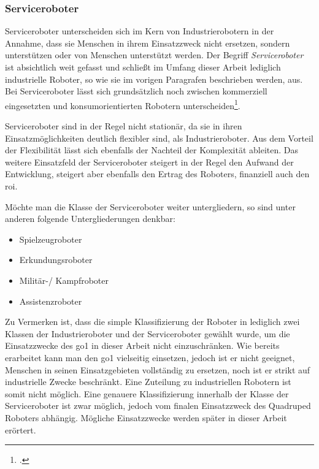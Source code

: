 \subsubsection{Serviceroboter}

Serviceroboter unterscheiden sich im Kern von Industrierobotern in der Annahme, dass sie Menschen in ihrem Einsatzzweck nicht ersetzen,
sondern unterstützen oder von Menschen unterstützt werden.
Der Begriff \emph{Serviceroboter} ist absichtlich weit gefasst und schließt im Umfang dieser Arbeit lediglich industrielle
Roboter, so wie sie im vorigen Paragrafen beschrieben werden, aus.
Bei Serviceroboter lässt sich grundsätzlich noch zwischen kommerziell eingesetzten und konsumorientierten Robotern unterscheiden\footcite{statista_robotics_market}.

Serviceroboter sind in der Regel nicht stationär, da sie in ihren Einsatzmöglichkeiten deutlich flexibler sind, als Industrieroboter.
Aus dem Vorteil der Flexibilität lässt sich ebenfalls der Nachteil der Komplexität ableiten.
Das weitere Einsatzfeld der Serviceroboter steigert in der Regel den Aufwand der Entwicklung, steigert aber ebenfalls
den Ertrag des Roboters, finanziell auch den \gls{roi}.

Möchte man die Klasse der Serviceroboter weiter untergliedern, so sind unter anderen folgende Untergliederungen denkbar:

\begin{itemize}
    \item Spielzeugroboter
    \item Erkundungsroboter
    \item Militär-/ Kampfroboter
    \item Assistenzroboter
\end{itemize}

Zu Vermerken ist, dass die simple Klassifizierung der Roboter in lediglich zwei Klassen der Industrieroboter und der Serviceroboter
gewählt wurde, um die Einsatzzwecke des \gls{go1} in dieser Arbeit nicht einzuschränken.
Wie bereits erarbeitet kann man den \gls{go1} vielseitig einsetzen, jedoch ist er nicht geeignet, Menschen in seinen Einsatzgebieten
vollständig zu ersetzen, noch ist er strikt auf industrielle Zwecke beschränkt.
Eine Zuteilung zu industriellen Robotern ist somit nicht möglich.
Eine genauere Klassifizierung innerhalb der Klasse der Serviceroboter ist zwar möglich, jedoch vom finalen Einsatzzweck des
Quadruped Roboters abhängig.
Mögliche Einsatzzwecke werden später in dieser Arbeit erörtert.

